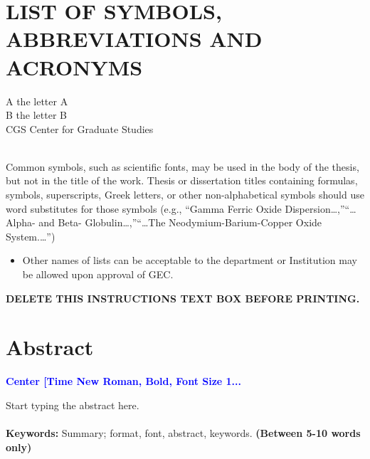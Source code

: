 \documentclass[a4paper,12pt,one side]{report}
\theoremstyle{definition}
\begin{document}
\chapter*{LIST OF SYMBOLS, ABBREVIATIONS AND ACRONYMS}
A	the letter A\\
B	the letter B\\
CGS	Center for Graduate Studies\\~\\

\begin{tcolorbox}[enhanced jigsaw,
    sharp corners,
    boxrule=0.5pt, 
    colback=blue!30!white,   
    borderline={0.5pt}{-2pt}{black,solid} %
 ]
 \begin{justify}
 Common symbols, such as scientific fonts, may be used in the body of the thesis, but not in the title of the work. Thesis or dissertation titles containing formulas, symbols, superscripts, Greek letters, or other non-alphabetical symbols should use word substitutes for those symbols (e.g., “Gamma Ferric Oxide Dispersion…,”“…Alpha- and Beta-  Globulin…,”“…The Neodymium-Barium-Copper Oxide System.…”)
\begin{itemize}
    \item Other names of lists can be acceptable to the department or Institution may be allowed upon approval of GEC.
\end{itemize}
{\bf DELETE THIS INSTRUCTIONS TEXT BOX BEFORE PRINTING.}
 \end{justify}
\end{tcolorbox}
\newpage
{}
\chapter*{Abstract}
\begin{center}
    {\small
  \bfseries \textcolor{blue}{Center [Time New Roman, Bold, Font Size 1...}
}
\\
\end{center}
\vspace{1cm}
Start typing the abstract here.\\~\\
{\bf Keywords:}	Summary; format, font, abstract, keywords. {\bf (Between 5-10 words only)}
\end{document}
